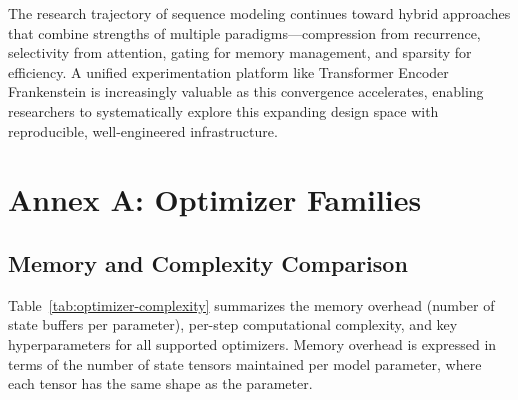 \documentclass[11pt,a4paper]{article}
\begin{document}
The research trajectory of sequence modeling continues toward hybrid approaches that combine strengths of multiple paradigms---compression from recurrence, selectivity from attention, gating for memory management, and sparsity for efficiency. A unified experimentation platform like Transformer Encoder Frankenstein is increasingly valuable as this convergence accelerates, enabling researchers to systematically explore this expanding design space with reproducible, well-engineered infrastructure.




\appendix

\section{Annex A: Optimizer Families}
\label{sec:annex-optimizers}

\subsection{Memory and Complexity Comparison}

Table~\ref{tab:optimizer-complexity} summarizes the memory overhead (number of state buffers per parameter), per-step computational complexity, and key hyperparameters for all supported optimizers. Memory overhead is expressed in terms of the number of state tensors maintained per model parameter, where each tensor has the same shape as the parameter.
\end{document}

